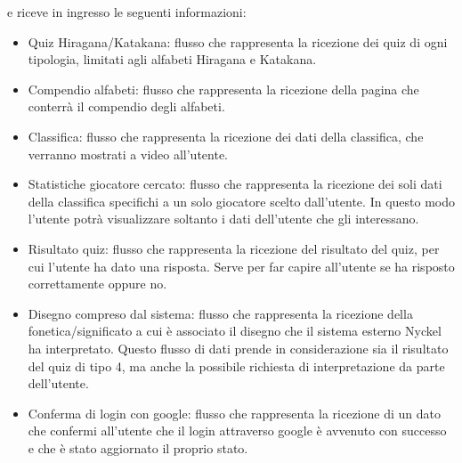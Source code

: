 \noindent
e riceve in ingresso le seguenti informazioni:
\begin{itemize}
    \item Quiz Hiragana/Katakana: flusso che rappresenta la ricezione dei quiz di ogni tipologia, limitati agli alfabeti Hiragana e Katakana.  
    \item Compendio alfabeti: flusso che rappresenta la ricezione della pagina che conterrà il compendio degli alfabeti.
    \item Classifica: flusso che rappresenta la ricezione dei dati della classifica, che verranno mostrati a video all'utente.
    \item Statistiche giocatore cercato: flusso che rappresenta la ricezione dei soli dati della classifica specifichi a un solo giocatore scelto dall'utente. In questo modo l'utente potrà visualizzare soltanto i dati dell'utente che gli interessano.
    \item Risultato quiz: flusso che rappresenta la ricezione del risultato del quiz, per cui l'utente ha dato una risposta. Serve per far capire all'utente se ha risposto correttamente oppure no.
    \item Disegno compreso dal sistema: flusso che rappresenta la ricezione della fonetica/significato a cui è associato il disegno che il sistema esterno Nyckel ha interpretato. Questo flusso di dati prende in considerazione sia il risultato del quiz di tipo 4, ma anche la possibile richiesta di interpretazione da parte dell'utente.
    \item Conferma di login con google: flusso che rappresenta la ricezione di un dato che confermi all'utente che il login attraverso google è avvenuto con successo e che è stato aggiornato il proprio stato.
\end{itemize}

